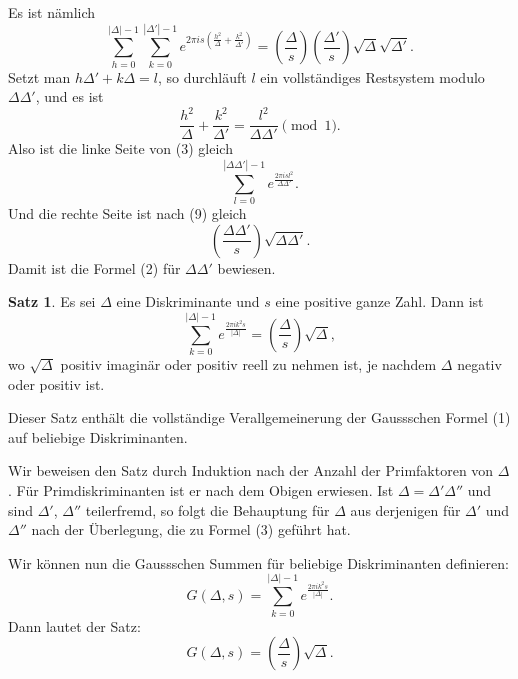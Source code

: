 \documentclass[12pt,a4paper]{article}
\theoremstyle{definition}
\newtheorem*{satz}{Satz}
\begin{document}
Es ist n\"amlich
\begin{equation}\tag{3}
\sum_{h=0}^{|\Delta|-1} \sum_{k=0}^{|\Delta'|-1} e^{2\pi i s \left(\frac{h^2}{\Delta} + \frac{k^2}{\Delta'}\right)} = \left(\frac{\Delta}{s}\right) \left(\frac{\Delta'}{s}\right) \sqrt{\Delta} \sqrt{\Delta'}.
\end{equation}
Setzt man $h\Delta' + k\Delta = l$, so durchl\"auft $l$ ein vollst\"andiges
Restsystem modulo $\Delta\Delta'$, und es ist
\begin{equation*}
\frac{h^2}{\Delta} + \frac{k^2}{\Delta'} = \frac{l^2}{\Delta\Delta'} \pmod{1}.
\end{equation*}
Also ist die linke Seite von (3) gleich
\begin{equation*}
\sum_{l=0}^{|\Delta\Delta'|-1} e^{\frac{2\pi i s l^2}{\Delta\Delta'}}.
\end{equation*}
Und die rechte Seite ist nach (9) gleich
\begin{equation*}
\left(\frac{\Delta\Delta'}{s}\right) \sqrt{\Delta\Delta'}.
\end{equation*}
Damit ist die Formel (2) f\"ur $\Delta\Delta'$ bewiesen.

\begin{satz}
Es sei $\Delta$ eine Diskriminante und $s$ eine positive ganze Zahl.
Dann ist
\begin{equation}\tag{4}
\sum_{k=0}^{|\Delta|-1} e^{\frac{2\pi i k^2 s}{|\Delta|}} = \left(\frac{\Delta}{s}\right) \sqrt{\Delta},
\end{equation}
wo $\sqrt{\Delta}$ positiv imagin\"ar oder positiv reell zu nehmen ist, je
nachdem $\Delta$ negativ oder positiv ist.
\end{satz}

Dieser Satz enth\"alt die vollst\"andige Verallgemeinerung der
Gaussschen Formel (1) auf beliebige Diskriminanten.

Wir beweisen den Satz durch Induktion nach der Anzahl der
Primfaktoren von $\Delta$. F\"ur Primdiskriminanten ist er nach
dem Obigen erwiesen. Ist $\Delta = \Delta' \Delta''$ und sind
$\Delta'$, $\Delta''$ teilerfremd, so folgt die Behauptung f\"ur
$\Delta$ aus derjenigen f\"ur $\Delta'$ und $\Delta''$ nach der
\"Uberlegung, die zu Formel (3) gef\"uhrt hat.

Wir k\"onnen nun die Gaussschen Summen f\"ur beliebige
Diskriminanten definieren:
\begin{equation}\tag{5}
G(\Delta, s) = \sum_{k=0}^{|\Delta|-1} e^{\frac{2\pi i k^2 s}{|\Delta|}}.
\end{equation}
Dann lautet der Satz:
\begin{equation}\tag{6}
G(\Delta, s) = \left(\frac{\Delta}{s}\right) \sqrt{\Delta}.
\end{equation}
\end{document}
